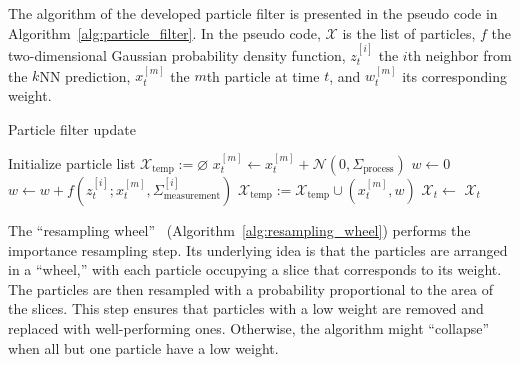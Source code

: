 \documentclass[11pt]{report}
\begin{document}
The algorithm of the developed particle filter is presented in the
pseudo code in Algorithm~\ref{alg:particle_filter}. In the pseudo
code, $\mathcal{X}$ is the list of particles, $f$ the two-dimensional
Gaussian probability density function, $z_t^{[i]}$ the $i$th neighbor
from the $k$NN prediction, $x_t^{[m]}$ the $m$th particle at time $t$,
and $w_t^{[m]}$ its corresponding weight.
\begin{algorithm}
\caption{Particle filter update}
\label{alg:particle_filter}
\begin{algorithmic}[1]
    \LineComment Initialize particle list
  \State $\mathcal{X}_{\text{temp}} := \varnothing$
  \State $x_t^{[m]} \gets x_t^{[m]} + \mathcal{N}(0, \Sigma_{\text{process}})$
  \State $w \gets 0$
  \State $w \gets w + f(z_t^{[i]} ; x_t^{[m]}, \Sigma_{\text{measurement}}^{[i]})$ 
       \EndFor
  \State $\mathcal{X}_{\text{temp}} := \mathcal{X}_{\text{temp}} \cup  (x_t^{[m]}, w)$
  \EndFor
  \State $\mathcal{X}_t \gets$ 
  \State \Return $\mathcal{X}_t$
  \EndProcedure
\end{algorithmic}
\end{algorithm}

The ``resampling wheel''~\cite{thrun}
(Algorithm~\ref{alg:resampling_wheel}) performs the importance
resampling step. Its underlying idea is that the particles are
arranged in a ``wheel,'' with each particle occupying a slice that
corresponds to its weight. The particles are then resampled with a
probability proportional to the area of the slices. This step ensures
that particles with a low weight are removed and replaced with
well-performing ones. Otherwise, the algorithm might ``collapse'' when
all but one particle have a low weight.
\end{document}
